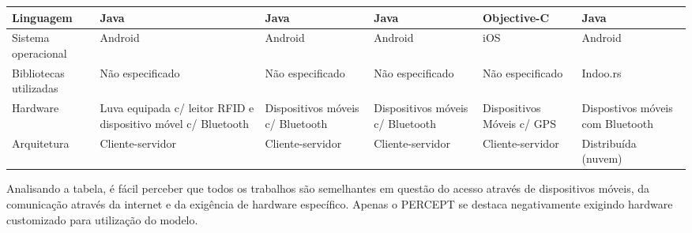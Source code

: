 \documentclass[twoside,english,brazilian]{UNISINOSartigo}
\begin{document}
\begin{table}
\begin{minipage}{0.9\textwidth}
\begin{adjustbox}{max width=\textwidth}
\begin{tabular}{ p{3cm} | p{3cm} | p{3cm} | p{3cm} | p{3cm} | p{3cm} }
	Linguagem & Java & Java & Java & Objective-C & Java \\ \hline
	Sistema operacional & Android & Android & Android & iOS & Android \\ \hline
	Bibliotecas utilizadas & Não especificado & Não especificado & Não especificado & Não especificado & Indoo.rs \\ \hline
	Hardware & Luva equipada c/ leitor RFID e dispositivo móvel c/ Bluetooth & Dispositivos móveis c/ Bluetooth & Dispositivos móveis c/ Bluetooth & Dispositivos Móveis c/ GPS & Dispostivos móveis com Bluetooth \\ \hline
	Arquitetura & Cliente-servidor & Cliente-servidor & Cliente-servidor & Cliente-servidor & Distribuída (nuvem) \\ \hline
		\end{tabular}
		\end{adjustbox}
	\end{minipage}
\end{table}

Analisando a tabela, é fácil perceber que todos os trabalhos são semelhantes em questão do acesso através de dispositivos móveis, da comunicação através da internet e da exigência de hardware específico. Apenas o PERCEPT se destaca negativamente exigindo hardware customizado para utilização do modelo.
\end{document}
